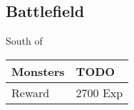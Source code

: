 \subsection{Battlefield}
\label{map:battlefield_20}

South of 

\noindent\begin{tabularx}{\textwidth}[l]{lX}
	Monsters
	& TODO
\\ \hline
	Reward & 2700 Exp
\end{tabularx}
